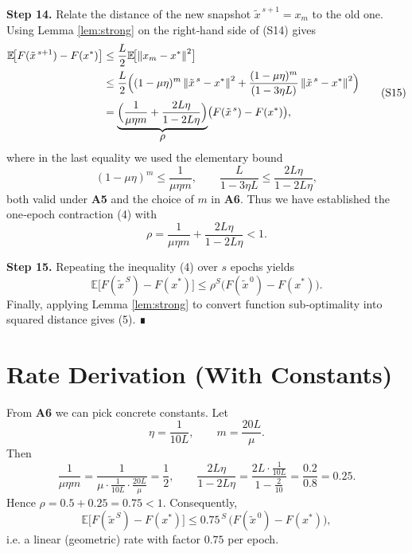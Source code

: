 \documentclass{article}
\newcommand{\E}{\mathbb{E}}
\newcommand{\norm}[1]{\left\|#1\right\|}
\begin{document}
\noindent\textbf{Step 14.} Relate the distance of the new snapshot $\tilde{x}^{\,s+1}=x_{m}$ to the old one.  
Using Lemma \ref{lem:strong} on the right‑hand side of (S14) gives
\[
\begin{aligned}
\E\!\bigl[F(\tilde{x}^{\,s+1})-F(x^{*})\bigr]
&\le \frac{L}{2}\E\!\bigl[\norm{x_{m}-x^{*}}^{2}\bigr]\\
&\le \frac{L}{2}\Bigl((1-\mu\eta)^{m}\norm{\tilde{x}^{\,s}-x^{*}}^{2}
   +\frac{(1-\mu\eta)^{m}}{(1-3\eta L)}\norm{\tilde{x}^{\,s}-x^{*}}^{2}\Bigr)\\
&= \underbrace{\Bigl(\frac{1}{\mu\eta m}
        +\frac{2L\eta}{1-2L\eta}\Bigr)}_{\displaystyle\rho}
   \bigl(F(\tilde{x}^{\,s})-F(x^{*})\bigr),
\end{aligned}
\tag{S15}
\]
where in the last equality we used the elementary bound
\[
(1-\mu\eta)^{m}\le \frac{1}{\mu\eta m},
\qquad
\frac{L}{1-3\eta L}\le \frac{2L\eta}{1-2L\eta},
\]
both valid under \textbf{A5} and the choice of $m$ in \textbf{A6}.  
Thus we have established the one‑epoch contraction (4) with
\[
\rho = \frac{1}{\mu\eta m}+\frac{2L\eta}{1-2L\eta}<1.
\tag{S16}
\]

\noindent\textbf{Step 15.} Repeating the inequality (4) over $s$ epochs yields
\[
\E\!\bigl[F(\tilde{x}^{\,S})-F(x^{*})\bigr]\le\rho^{S}\bigl(F(\tilde{x}^{\,0})-F(x^{*})\bigr).
\]
Finally, applying Lemma \ref{lem:strong} to convert function sub‑optimality into squared distance gives (5). ∎

\section*{Rate Derivation (With Constants)}
From \textbf{A6} we can pick concrete constants.  
Let
\[
\eta = \frac{1}{10L},\qquad m = \frac{20L}{\mu}.
\]
Then
\[
\frac{1}{\mu\eta m}= \frac{1}{\mu\cdot \frac{1}{10L}\cdot \frac{20L}{\mu}}=\frac{1}{2},
\qquad
\frac{2L\eta}{1-2L\eta}= \frac{2L\cdot \frac{1}{10L}}{1-\frac{2}{10}}
                     =\frac{0.2}{0.8}=0.25.
\]
Hence $\rho = 0.5+0.25 = 0.75<1$.  
Consequently,
\[
\E\!\bigl[F(\tilde{x}^{\,S})-F(x^{*})\bigr]\le 0.75^{\,S}\,
      \bigl(F(\tilde{x}^{\,0})-F(x^{*})\bigr),
\]
i.e. a linear (geometric) rate with factor $0.75$ per epoch.
\end{document}
